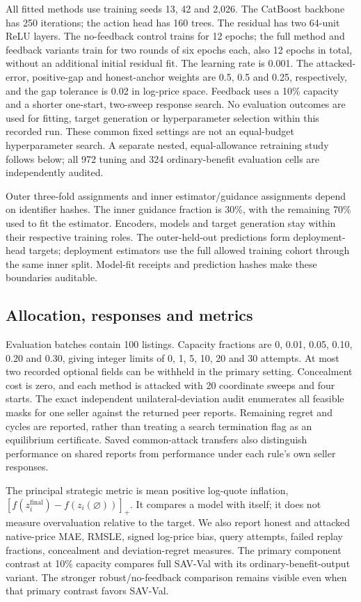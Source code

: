 \documentclass[10pt,journal]{IEEEtran}
\begin{document}
All fitted methods use training seeds 13, 42 and 2,026. The CatBoost
backbone has 250 iterations; the action head has 160 trees. The residual
has two 64-unit ReLU layers. The no-feedback control trains for 12 epochs;
the full method and feedback variants train for two rounds of six epochs
each, also 12 epochs in total, without an additional initial residual fit.
The learning rate is 0.001. The attacked-error,
positive-gap and honest-anchor weights are 0.5, 0.5 and 0.25, respectively,
and the gap tolerance is 0.02 in log-price space. Feedback uses a 10\%
capacity and a shorter one-start, two-sweep response search. No evaluation
outcomes are used for fitting, target generation or hyperparameter
selection within this recorded run. These common fixed settings are not
an equal-budget hyperparameter search. A separate nested, equal-allowance
retraining study follows below; all 972 tuning and 324 ordinary-benefit
evaluation cells are independently audited.

Outer three-fold assignments and inner estimator/guidance assignments
depend on identifier hashes. The inner guidance fraction is 30\%, with
the remaining 70\% used to fit the estimator. Encoders, models and target
generation stay within their respective training roles. The outer-held-out
predictions form deployment-head targets; deployment estimators use the
full allowed training cohort through the same inner split. Model-fit
receipts and prediction hashes make these boundaries auditable.

\subsection{Allocation, responses and metrics}
Evaluation batches contain 100 listings. Capacity fractions are
0, 0.01, 0.05, 0.10, 0.20 and 0.30, giving integer limits of 0, 1, 5, 10,
20 and 30 attempts. At most two recorded optional fields can be withheld
in the primary setting. Concealment cost is zero, and each method is
attacked with 20 coordinate sweeps and four starts. The exact independent
unilateral-deviation audit enumerates all feasible masks for one seller
against the returned peer reports. Remaining regret and cycles are
reported, rather than treating a search termination flag as an
equilibrium certificate. Saved common-attack transfers also distinguish
performance on shared reports from performance under each rule's own
seller responses.

The principal strategic metric is mean positive log-quote inflation,
$[f(z_i^{\mathrm{final}})-f(z_i(\varnothing))]_+$. It compares a model
with itself; it does not measure overvaluation relative to the target.
We also report honest and attacked native-price MAE, RMSLE, signed
log-price bias, query attempts, failed replay fractions, concealment and
deviation-regret measures. The primary component contrast at 10\%
capacity compares full SAV-Val with its ordinary-benefit-output variant.
The stronger robust/no-feedback comparison remains visible even when
that primary contrast favors SAV-Val.
\end{document}
